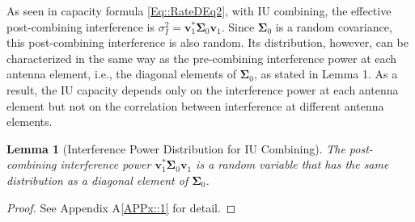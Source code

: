 \documentclass[12pt, draftclsnofoot, onecolumn]{IEEEtran}
\newtheorem{MomentsLemma}{Lemma}
\theoremstyle{plain}
\begin{document}
{As seen in capacity formula \eqref{Eq::RateDEq2}, with IU combining, the effective post-combining interference is $\sigma_I^2 = \mathbf{v}_1^\ast \boldsymbol{\Sigma}_{0} \mathbf{v}_1$. Since $\boldsymbol{\Sigma}_{0}$ is a random covariance, this post-combining interference is also random. Its distribution, however, can be characterized in the same way as the pre-combining interference power at each antenna element, i.e., the diagonal elements of $\boldsymbol{\Sigma}_{0}$, as stated in Lemma 1. As a result, the IU capacity depends only on the interference power at each antenna element but not on the correlation between interference at different antenna elements.
\begin{MomentsLemma}[Interference Power Distribution for IU Combining]\label{Lemma:PostCombInt}
The post-combining interference power $\!\mathbf{v}_1^\ast \boldsymbol{\Sigma}_{0} \mathbf{v}_1$ is a random variable that has the same distribution as a diagonal element of $\boldsymbol{\Sigma}_{0}$. \vspace{-.4in}
\end{MomentsLemma}
\begin{proof}
See Appendix A\ref{APPx::1} for detail.
\end{proof}

}
\end{document}
